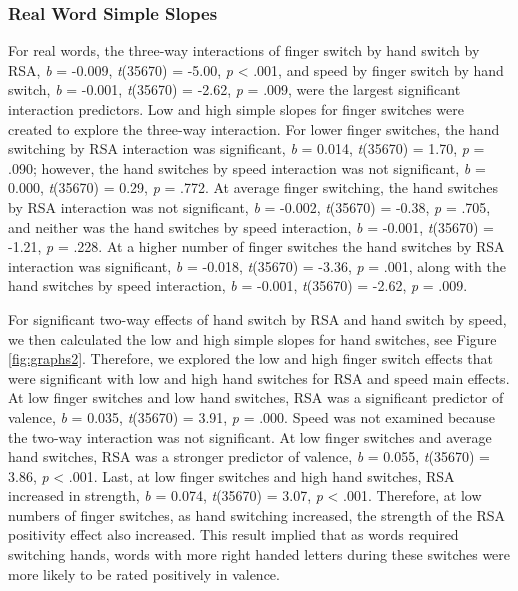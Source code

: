 \documentclass[
  english,
  man,mask]{apa7}
\begin{document}
\hypertarget{real-word-simple-slopes}{%
\subsubsection{Real Word Simple Slopes}\label{real-word-simple-slopes}}

For real words, the three-way interactions of finger switch by hand switch by RSA, \emph{b} = -0.009, \emph{t}(35670) = -5.00, \emph{p} \textless{} .001, and speed by finger switch by hand switch, \emph{b} = -0.001, \emph{t}(35670) = -2.62, \emph{p} = .009, were the largest significant interaction predictors. Low and high simple slopes for finger switches were created to explore the three-way interaction. For lower finger switches, the hand switching by RSA interaction was significant, \emph{b} = 0.014, \emph{t}(35670) = 1.70, \emph{p} = .090; however, the hand switches by speed interaction was not significant, \emph{b} = 0.000, \emph{t}(35670) = 0.29, \emph{p} = .772. At average finger switching, the hand switches by RSA interaction was not significant, \emph{b} = -0.002, \emph{t}(35670) = -0.38, \emph{p} = .705, and neither was the hand switches by speed interaction, \emph{b} = -0.001, \emph{t}(35670) = -1.21, \emph{p} = .228. At a higher number of finger switches the hand switches by RSA interaction was significant, \emph{b} = -0.018, \emph{t}(35670) = -3.36, \emph{p} = .001, along with the hand switches by speed interaction, \emph{b} = -0.001, \emph{t}(35670) = -2.62, \emph{p} = .009.

For significant two-way effects of hand switch by RSA and hand switch by speed, we then calculated the low and high simple slopes for hand switches, see Figure \ref{fig:graphs2}. Therefore, we explored the low and high finger switch effects that were significant with low and high hand switches for RSA and speed main effects. At low finger switches and low hand switches, RSA was a significant predictor of valence, \emph{b} = 0.035, \emph{t}(35670) = 3.91, \emph{p} = .000. Speed was not examined because the two-way interaction was not significant. At low finger switches and average hand switches, RSA was a stronger predictor of valence, \emph{b} = 0.055, \emph{t}(35670) = 3.86, \emph{p} \textless{} .001. Last, at low finger switches and high hand switches, RSA increased in strength, \emph{b} = 0.074, \emph{t}(35670) = 3.07, \emph{p} \textless{} .001. Therefore, at low numbers of finger switches, as hand switching increased, the strength of the RSA positivity effect also increased. This result implied that as words required switching hands, words with more right handed letters during these switches were more likely to be rated positively in valence.
\end{document}
